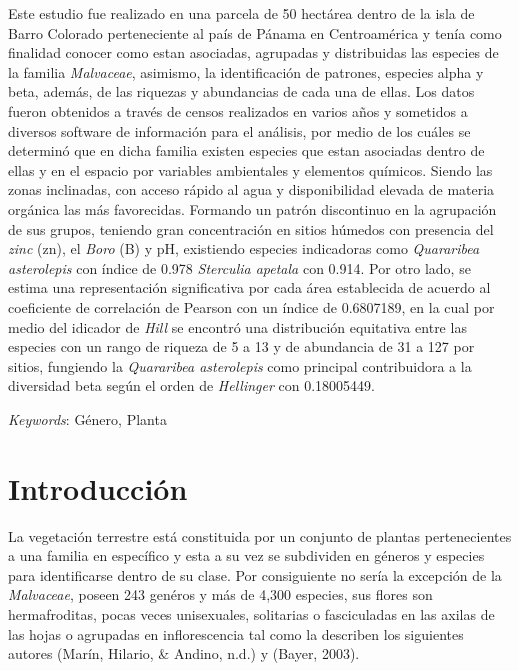 \documentclass[11pt,]{article}
\renewenvironment{abstract}
 {{%
    \setlength{\leftmargin}{0mm}
    \setlength{\rightmargin}{\leftmargin}%
  }%
  \relax}
 {\endlist}
\begin{document}
\begin{abstract}

    \hbox{\vrule height .2pt width 39.14pc}

    \vskip 8.5pt %

\noindent Este estudio fue realizado en una parcela de 50 hectárea dentro de la
isla de Barro Colorado perteneciente al país de Pánama en Centroamérica
y tenía como finalidad conocer como estan asociadas, agrupadas y
distribuidas las especies de la familia \emph{Malvaceae}, asimismo, la
identificación de patrones, especies alpha y beta, además, de las
riquezas y abundancias de cada una de ellas. Los datos fueron obtenidos
a través de censos realizados en varios años y sometidos a diversos
software de información para el análisis, por medio de los cuáles se
determinó que en dicha familia existen especies que estan asociadas
dentro de ellas y en el espacio por variables ambientales y elementos
químicos. Siendo las zonas inclinadas, con acceso rápido al agua y
disponibilidad elevada de materia orgánica las más favorecidas. Formando
un patrón discontinuo en la agrupación de sus grupos, teniendo gran
concentración en sitios húmedos con presencia del \emph{zinc} (zn), el
\emph{Boro} (B) y pH, existiendo especies indicadoras como
\emph{Quararibea asterolepis} con índice de 0.978 \emph{Sterculia
apetala} con 0.914. Por otro lado, se estima una representación
significativa por cada área establecida de acuerdo al coeficiente de
correlación de Pearson con un índice de 0.6807189, en la cual por medio
del idicador de \emph{Hill} se encontró una distribución equitativa
entre las especies con un rango de riqueza de 5 a 13 y de abundancia de
31 a 127 por sitios, fungiendo la \emph{Quararibea asterolepis} como
principal contribuidora a la diversidad beta según el orden de
\emph{Hellinger} con 0.18005449.


\vskip 8.5pt \noindent \emph{Keywords}: Género, Planta \par

    \hbox{\vrule height .2pt width 39.14pc}



\end{abstract}


\vskip 6.5pt


\noindent  \section{Introducción}\label{introducciuxf3n}

La vegetación terrestre está constituida por un conjunto de plantas
pertenecientes a una familia en específico y esta a su vez se subdividen
en géneros y especies para identificarse dentro de su clase. Por
consiguiente no sería la excepción de la \emph{Malvaceae}, poseen 243
genéros y más de 4,300 especies, sus flores son hermafroditas, pocas
veces unisexuales, solitarias o fasciculadas en las axilas de las hojas
o agrupadas en inflorescencia tal como la describen los siguientes
autores (Marín, Hilario, \& Andino, n.d.) y (Bayer, 2003).
\end{document}
